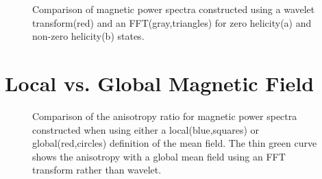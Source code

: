 \documentclass[manuscript]{aastex}
\begin{document}
\begin{figure}
\caption{\label{fig:WavevsFFT} Comparison of magnetic power spectra constructed using a wavelet transform(red) and an FFT(gray,triangles) for zero helicity(a) and non-zero helicity(b) states.}
\end{figure}

\section{Local vs. Global Magnetic Field}\label{sec:LocGlobe}

\begin{figure}
\caption{\label{fig:globalcomparison} Comparison of the anisotropy ratio for magnetic power spectra constructed when using either a local(blue,squares) or global(red,circles) definition of the mean field. The thin green curve shows the anisotropy with a global mean field using an FFT transform rather than wavelet.}
\end{figure}
\end{document}
